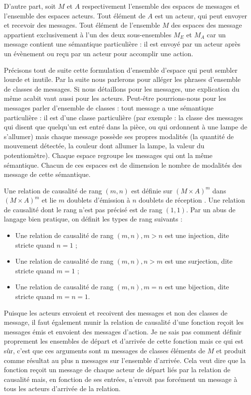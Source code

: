 \documentclass[11pt]{article}
\begin{document}
D'autre part, soit $M$ et $A$ respectivement l'ensemble des espaces de messages et l'ensemble des espaces acteurs. Tout élément de $A$ est un acteur, qui peut envoyer et recevoir des messages. Tout élément de l'ensemble $M$ des espaces des message appartient exclusivement à l'un des deux sous-ensembles $M_E$ et $M_A$ car un message contient une sémantique particulière : il est envoyé par un acteur après un évènement ou reçu par un acteur pour accomplir une action.

Précisons tout de suite cette formulation d'\og ensemble d'espace \fg{} qui peut sembler lourde et inutile. Par la suite nous parlerons pour alléger les phrases d'ensemble de classes de messages. Si nous détaillons pour les messages, une explication du même acabit vaut aussi pour les acteurs. Peut-être pourrions-nous pour les messages parler d'ensemble de classes : tout message a une sémantique particulière : il est d'une classe particulière (par exemple : la classe des messages qui disent que quelqu'un est entré dans la pièce, ou qui ordonnent à une lampe de s'allumer) mais chaque message possède ses propres modalités (la quantité de mouvement détectée, la couleur dont allumer la lampe, la valeur du potentiomètre). Chaque espace regroupe les messages qui ont la même sémantique. Chacun de ces espaces est de dimension le nombre de modalités des message de cette sémantique.

Une relation de causalité de rang $(m, n)$ est définie sur $\left(M×A\right)^m$ dans $\left(M×A\right)^m$ et lie $m$ doublets \og d'émission \fg{} à $n$ doublets \og de réception \fg{}. Une relation de causalité dont le rang n'est pas précisé est de rang $(1, 1)$. Par un abus de langage bien pratique, on définit les types de rang suivants :
\begin{itemize}
\item Une relation de causalité de rang $(m, n), m > n$ est une injection, dite stricte quand $n = 1$ ;
\item Une relation de causalité de rang $(m, n), n > m$ est une surjection, dite stricte quand $m = 1$ ;
\item Une relation de causalité de rang $(m, n), m = n$ est une bijection, dite stricte quand $m = n = 1$.
\end{itemize}

Puisque les acteurs envoient et recoivent des messages et non des classes de message, il faut également munir la relation de causalité d'une fonction reçoit les messages émis et envoient des messages d'action. Je ne sais pas comment définir proprement les ensembles de départ et d'arrivée de cette fonction mais ce qui est sûr, c'est que ces arguments sont m messages de classes éléments de $M$ et produit comme résultat au plus n messages sur l'ensemble d'arrivée. Cela veut dire que la fonction reçoit un message de chaque acteur de départ liés par la relation de causalité mais, en fonction de ses entrées, n'envoit pas forcément un message à tous les acteurs d'arrivée de la relation.
\end{document}
